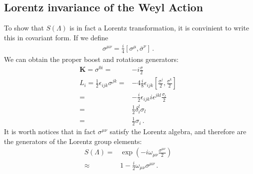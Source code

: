 \subsection{Lorentz invariance of the Weyl Action}
To show that $S(\Lambda)$ is in fact a Lorentz transformation, it is convinient to write this in covariant form. If we define
\begin{align}
  \sigma^{\mu\nu}=\frac{i}{4}\left[\sigma^\mu,\overline{\sigma}^\nu\right]\,.
\end{align}
We can obtain the proper boost and rotations generators:
\begin{align*}
 \mathbf{K}= \sigma^{0i}=&-i\frac{\sigma}{2}\nonumber\\
 L_{i}=\frac{1}{2}\epsilon_{ijk}\sigma^{jk}=&-4\frac{i}{8}\epsilon_{ijk}\left[\frac{\sigma^j}{2},\frac{\sigma^k}{2}  \right]\nonumber\\
=&-\tfrac{i}{2}\epsilon_{ijk}i\epsilon^{jkl}\frac{\sigma_l}{2}\nonumber\\
=&\tfrac{1}{2}\delta_i^l\sigma_l\nonumber\\
=&\tfrac{1}{2}\sigma_i\,.
\end{align*}
It is worth notices that in fact $\sigma^{\mu\nu}$ satisfy the Lorentz algebra, and therefore are the generators of the Lorentz group elements:
\begin{align}
  S(\Lambda)=&\exp\left(-i \omega_{\mu\nu}\frac{\sigma^{\mu\nu}}{2}\right)\nonumber\\
  \approx&1-\frac{i}{2} \omega_{\mu\nu}{\sigma^{\mu\nu}}\,.
\end{align}


